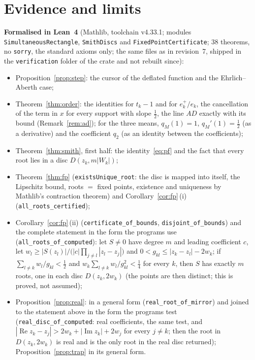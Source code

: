 \documentclass[10pt,a4paper]{article}
\theoremstyle{definition}
\numberwithin{equation}{section}
\begin{document}
\section{Evidence and limits}\label{sec:evidence}
\textbf{Formalised in Lean~4} (Mathlib, toolchain v4.33.1; modules \texttt{SimultaneousRectangle},
\texttt{SmithDiscs} and \texttt{FixedPointCertificate}; 38 theorems, no \texttt{sorry}, the standard
axioms only; the same files as in revision~7, shipped in the \texttt{verification} folder of the crate
and not rebuilt since):
\begin{itemize}
\item Proposition~\ref{prop:step}: the cursor of the deflated function and the Ehrlich--Aberth case;
\item Theorem~\ref{thm:order}: the identities for $t_k-1$ and for $e_k^+/e_k$, the cancellation of the
 term in $x$ for every support with slope $\frac12$, the line $AD$ exactly with its bound
 (Remark~\ref{rem:ad}); for the three means, $q_M(1)=1$, $q_M'(1)=\frac12$ (as a derivative) and
 the coefficient $q_2$ (as an identity between the coefficients);
\item Theorem~\ref{thm:smith}, first half: the identity~\eqref{eq:pf} and the fact that every root
 lies in a disc $D(z_k,m|W_k|)$;
\item Theorem~\ref{thm:fp} (\texttt{existsUnique\_root}: the disc is mapped into itself, the Lipschitz
 bound, roots $=$ fixed points, existence and uniqueness by Mathlib's contraction theorem) and
 Corollary~\ref{cor:fp}\,(i) (\texttt{all\_roots\_certified});
\item Corollary~\ref{cor:fp}\,(ii) (\texttt{certificate\_of\_bounds}, \texttt{disjoint\_of\_bounds}) and
 the complete statement in the form the programs use (\texttt{all\_roots\_of\_computed}): let $S\ne0$
 have degree $m$ and leading coefficient $c$, let $w_l\ge|S(z_l)|/\bigl(|c|\prod_{j\ne l}|z_l-z_j|\bigr)$
 and $0<g_{kl}\le|z_k-z_l|-2w_k$; if $\sum_{l\ne k}w_l/g_{kl}<\frac12$ and
 $w_k\sum_{l\ne k}w_l/g_{kl}^2<\frac14$ for every $k$, then $S$ has exactly $m$ roots, one in each disc
 $D(z_k,2w_k)$ (the points are then distinct; this is proved, not assumed);
\item Proposition~\ref{prop:real}: in a general form (\texttt{real\_root\_of\_mirror}) and joined to the
 statement above in the form the programs test (\texttt{real\_disc\_of\_computed}: real coefficients,
 the same test, and $|\operatorname{Re}z_k-z_j|>2w_k+|\operatorname{Im}z_k|+2w_j$ for every $j\ne k$;
 then the root in $D(z_k,2w_k)$ is real and is the only root in the real disc returned);
 Proposition~\ref{prop:trap} in its general form.
\end{itemize}
\end{document}
